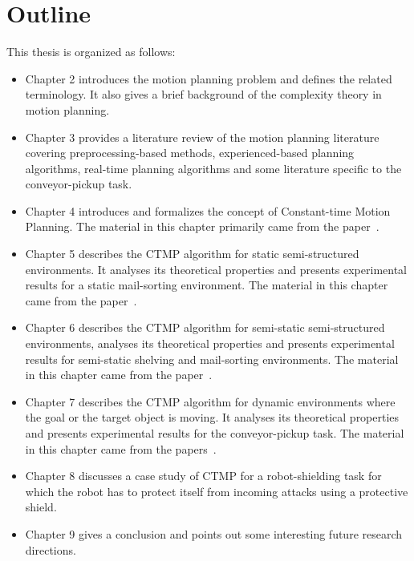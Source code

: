 \documentclass[a4paper]{report}
\begin{document}
\section{Outline}
This thesis is organized as follows:
\begin{itemize}
\item Chapter 2 introduces the motion planning problem and defines the related terminology. It also gives a brief background of the complexity theory in motion planning.

\item Chapter 3 provides a literature review of the motion planning literature covering preprocessing-based methods, experienced-based planning algorithms, real-time planning algorithms and some literature specific to the conveyor-pickup task.

\item Chapter 4 introduces and formalizes the concept of Constant-time Motion Planning. The material in this chapter primarily came from the paper~\cite{ijrr_conveyor}.

\item Chapter 5 describes the CTMP algorithm for static semi-structured environments. It analyses its theoretical properties and presents experimental results for a static mail-sorting environment. The material in this chapter came from the paper~\cite{ISL19}.

\item Chapter 6 describes the CTMP algorithm for semi-static semi-structured environments, analyses its theoretical properties and presents experimental results for semi-static shelving and mail-sorting environments. The material in this chapter came from the paper~\cite{islam2020alternative}.

\item Chapter 7 describes the CTMP algorithm for dynamic environments where the goal or the target object is moving. It analyses its theoretical properties and presents experimental results for the conveyor-pickup task. The material in this chapter came from the papers~\cite{islam2020provably, ijrr_conveyor}.

\item Chapter 8 discusses a case study of CTMP for a robot-shielding task for which the robot has to protect itself from incoming attacks using a protective shield.

\item Chapter 9 gives a conclusion and points out some interesting future research directions.

\end{itemize}
\end{document}
